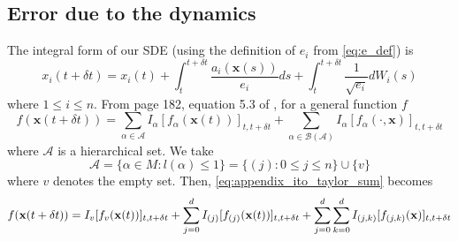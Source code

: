 \subsection{Error due to the dynamics}

The integral form of our SDE (using the definition of $e_i$ from \eqref{eq:e_def}) is
\begin{equation}
x_{i}(t + \delta t) = x_{i}(t) + \int_{t}^{t + \delta t} \frac{a_i(\mathbf{x}(s))}{e_i} ds + \int_{t}^{t+\delta t} \frac{1}{\sqrt{e_i}} dW_i(s)
\end{equation}
where $1 \le i \le n$. 
%
From page 182, equation 5.3 of \cite{kloeden1992numerical}, for a general function $f$
%
\begin{equation} \label{eq:appendix_ito_taylor_sum}
f(\mathbf{x}(t+\delta t)) = \sum_{\alpha \in \mathcal{A}} I_\alpha[f_\alpha (\mathbf{x}(t))]_{t, t+\delta t} + \sum_{\alpha \in \mathcal{B}(\mathcal{A})} I_\alpha [f_\alpha(\cdot, \mathbf{x})]_{t, t+\delta t}
\end{equation}
where $\mathcal{A}$ is a hierarchical set. 
%
We take 
\begin{equation}
 \mathcal{A} = \{ \alpha \in M : l(\alpha) \le 1 \} = \{ (j) : 0 \le j \le n \} \cup \{v \}
\end{equation}
%
where $v$ denotes the empty set.
%
Then, \eqref{eq:appendix_ito_taylor_sum} becomes
\begin{equation} \label{eq:general_ito_taylor_sum}
f(\mathbf{x}(t+\delta t)) = I_{v} [f_v(\mathbf{x}(t))]_{t, t+\delta t} + \sum_{j=0}^d I_{(j)} [f_{(j)}(\mathbf{x}(t))]_{t, t+\delta t} + \sum_{j=0}^d \sum_{k=0}^d I_{(j,k)} [f_{(j,k)} ( \mathbf{x} )]_{t, t+\delta t}
\end{equation}

